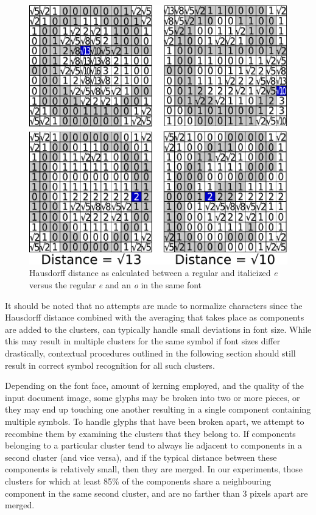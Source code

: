\documentclass[times, 10pt,twocolumn]{article}
\begin{document}
\begin{figure}[ht]
  \centering
  \includegraphics[scale=.5]{figures/haus_dist_comparisons}
  \caption{Hausdorff distance as calculated between a regular and italicized
  {\em e} versus the regular {\em e} and an {\em o} in the same font}
  \label{hausdist_fig}
\end{figure}

It should be noted that no attempts are made to normalize characters since the
Hausdorff distance combined with the averaging that takes place as components
are added to the clusters, can typically handle small deviations in font size.
While this may result in multiple clusters for the same symbol if font sizes
differ drastically, contextual procedures outlined in the following section
should still result in correct symbol recognition for all such clusters.

Depending on the font face, amount of kerning employed, and the quality of the
input document image, some glyphs may be broken into two or more pieces, or
they may end up touching one another resulting in a single component containing
multiple symbols.
%
To handle glyphs that have been broken apart, we attempt to recombine them by
examining the clusters that they belong to.  If components belonging to a
particular cluster tend to always lie adjacent to components in a second
cluster (and vice versa), and if the typical distance between these components
is relatively small, then they are merged.  In our experiments, those clusters
for which at least 85\% of the components share a neighbouring component in the
same second cluster, and are no farther than 3 pixels apart are merged.
\end{document}
